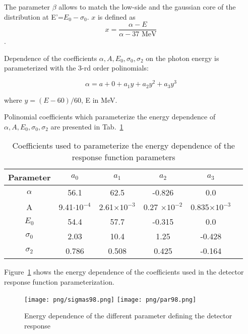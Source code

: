 The parameter $\beta$  allows to match the low-side and the gaussian core
of the distribution at E'=$E_0-\sigma_0$.
$x$ is defined as
$$
  x= \frac{\alpha- E}{\alpha -37 \text{ MeV}}
$$.

Dependence of the coefficients $\alpha, A, E_0, \sigma_0, \sigma_2$ on the photon energy
is parameterized with the 3-rd order polinomials:

\begin{equation}
  \alpha= a+0+a_1y+a_2y^2+a_3y^3
\end{equation}

where $y= (E-60)/60$, E in MeV.

Polinomial coefficients which parameterize the energy dependence of
$\alpha, A, E_0, \sigma_0, \sigma_2$ are presented in Tab.~\ref{tab:param98}

\begin{table}[!h] \label{tab:param98}
  \begin{center}
    \begin{tabular}{| c | c | c | c | c | c | }
      \hline
      Parameter  & $a_0$              & $a_1$ & $a_2$ & $a_3$ \\ \hline
      $\alpha$   & 56.1               &62.5 & -0.826 & 0.0  \\ \hline
      A          & 9.41$\cdot 10^{-4}$ & 2.61$\times 10^{-3}$ &0.27 $\times 10^{-2}$ &0.835$\times 10^{-3}$   \\ \hline
      $E_0$      & 54.4               & 57.7 & -0.315 &0.0 \\ \hline
      $\sigma_0$ & 2.03               &10.4 &1.25 & -0.428\\ \hline
      $\sigma_2$ & 0.786              & 0.508 & 0.425 & -0.164\\ \hline
    \end{tabular}
  \end{center}
  \caption{Coefficients used to parameterize the energy dependence of the response function parameters}
\end{table}

Figure~\ref{fig:parameters98} shows the energy dependence of the coefficients used
in the detector response function parameterization.

\begin{figure}[!h]
  \begin{center}
    \texttt{[image: png/sigmas98.png]} 
    \texttt{[image: png/par98.png]} 
  \end{center}
  \caption{Energy dependence of the different parameter defining the detector response}
  \label{fig:parameters98}
\end{figure}

